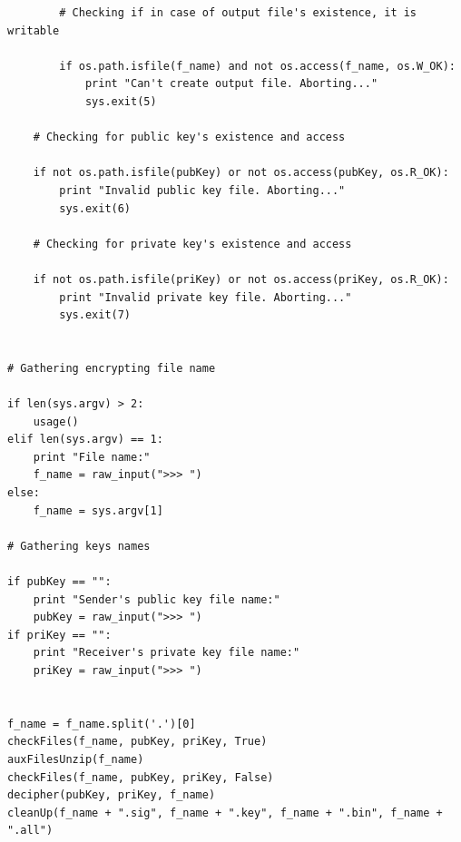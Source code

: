 \documentclass[a4paper,11pt,openright,oneside]{report}
\begin{document}
\begin{appendices}
\begin{verbatim}
        # Checking if in case of output file's existence, it is writable

        if os.path.isfile(f_name) and not os.access(f_name, os.W_OK):
            print "Can't create output file. Aborting..."
            sys.exit(5)

    # Checking for public key's existence and access

    if not os.path.isfile(pubKey) or not os.access(pubKey, os.R_OK):
        print "Invalid public key file. Aborting..."
        sys.exit(6)

    # Checking for private key's existence and access

    if not os.path.isfile(priKey) or not os.access(priKey, os.R_OK):
        print "Invalid private key file. Aborting..."
        sys.exit(7)


# Gathering encrypting file name

if len(sys.argv) > 2:
    usage()
elif len(sys.argv) == 1:
    print "File name:"
    f_name = raw_input(">>> ")
else:
    f_name = sys.argv[1]

# Gathering keys names

if pubKey == "":
    print "Sender's public key file name:"
    pubKey = raw_input(">>> ")
if priKey == "":
    print "Receiver's private key file name:"
    priKey = raw_input(">>> ")


f_name = f_name.split('.')[0]
checkFiles(f_name, pubKey, priKey, True)
auxFilesUnzip(f_name)
checkFiles(f_name, pubKey, priKey, False)
decipher(pubKey, priKey, f_name)
cleanUp(f_name + ".sig", f_name + ".key", f_name + ".bin", f_name + ".all")
\end{verbatim}
\end{appendices}

\maketitle
\nocite{*}
\printbibliography[title={Referências}]
\end{document}
